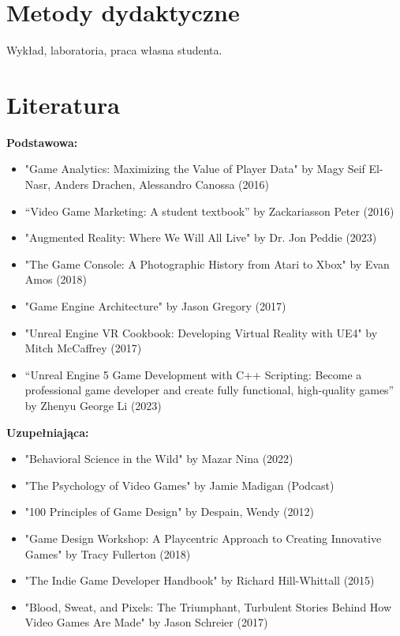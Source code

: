 \documentclass[12pt, a4paper]{article}
\begin{document}
\section{Metody dydaktyczne}

Wykład, laboratoria, praca własna studenta.

\section{Literatura}

\textbf{Podstawowa:}
\begin{itemize}
  \item "Game Analytics: Maximizing the Value of Player Data" by Magy Seif El-Nasr, Anders Drachen, Alessandro Canossa (2016)
  \item “Video Game Marketing: A student textbook” by Zackariasson Peter (2016)
  \item "Augmented Reality: Where We Will All Live" by Dr. Jon Peddie (2023)
  \item "The Game Console: A Photographic History from Atari to Xbox" by Evan Amos (2018)
  \item "Game Engine Architecture" by Jason Gregory (2017)
  \item "Unreal Engine VR Cookbook: Developing Virtual Reality with UE4" by Mitch McCaffrey (2017)
  \item “Unreal Engine 5 Game Development with C++ Scripting: Become a professional game developer and create fully functional, high-quality games” by Zhenyu George Li (2023)
\end{itemize}

\textbf{Uzupełniająca:}
\begin{itemize}
  \item "Behavioral Science in the Wild" by Mazar Nina (2022)
  \item "The Psychology of Video Games" by Jamie Madigan (Podcast)
  \item "100 Principles of Game Design" by Despain, Wendy (2012)
  \item "Game Design Workshop: A Playcentric Approach to Creating Innovative Games" by Tracy Fullerton (2018)
  \item "The Indie Game Developer Handbook" by Richard Hill-Whittall (2015)
  \item "Blood, Sweat, and Pixels: The Triumphant, Turbulent Stories Behind How Video Games Are Made" by Jason Schreier (2017)
\end{itemize}
\end{document}
